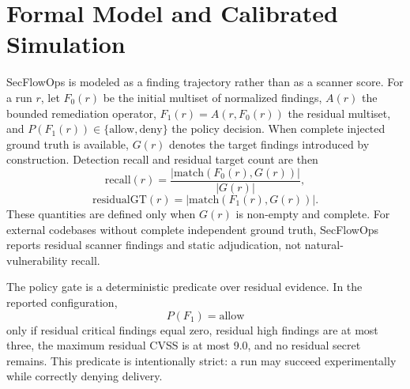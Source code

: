 \section{Formal Model and Calibrated Simulation}

SecFlowOps is modeled as a finding trajectory rather than as a scanner score. For a run $r$, let $F_0(r)$ be the initial multiset of normalized findings, $A(r)$ the bounded remediation operator, $F_1(r)=A(r,F_0(r))$ the residual multiset, and $P(F_1(r))\in\{\mathrm{allow},\mathrm{deny}\}$ the policy decision. When complete injected ground truth is available, $G(r)$ denotes the target findings introduced by construction. Detection recall and residual target count are then
\begin{equation}
\mathrm{recall}(r)=\frac{|\mathrm{match}(F_0(r),G(r))|}{|G(r)|},
\end{equation}
\begin{equation}
\mathrm{residualGT}(r)=|\mathrm{match}(F_1(r),G(r))|.
\end{equation}
These quantities are defined only when $G(r)$ is non-empty and complete. For external codebases without complete independent ground truth, SecFlowOps reports residual scanner findings and static adjudication, not natural-vulnerability recall.

The policy gate is a deterministic predicate over residual evidence. In the reported configuration,
\begin{equation}
P(F_1)=\mathrm{allow}
\end{equation}
only if residual critical findings equal zero, residual high findings are at most three, the maximum residual CVSS is at most 9.0, and no residual secret remains. This predicate is intentionally strict: a run may succeed experimentally while correctly denying delivery.

